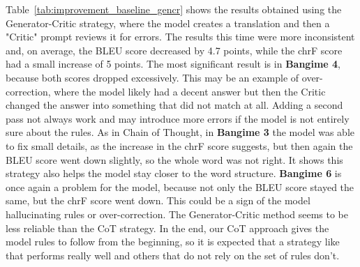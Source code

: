 \documentclass[
	a4paper, %
	10pt, %
	unnumberedsections, %
	twoside, %
]{LTJournalArticle}
\begin{document}
Table~\ref{tab:improvement_baseline_gencr} shows the results obtained using the Generator-Critic strategy, where the model creates a translation and then a "Critic" prompt reviews it for errors. The results this time were more inconsistent and, on average, the BLEU score decreased by 4.7 points, while the chrF score had a small increase of 5 points.
The most significant result is in \textbf{Bangime 4}, because both scores dropped excessively. This may be an example of over-correction, where the model likely had a decent answer but then the Critic changed the answer into something that did not match at all. Adding a second pass not always work and may introduce more errors if the model is not entirely sure about the rules. As in Chain of Thought, in \textbf{Bangime 3} the model was able to fix small details, as the increase in the chrF score suggests, but then again the BLEU score went down slightly, so the whole word was not right. It shows this strategy also helps the model stay closer to the word structure. \textbf{Bangime 6} is once again a problem for the model, because not only the BLEU score stayed the same, but the chrF score went down. This could be a sign of the model hallucinating rules or over-correction.
The Generator-Critic method seems to be less reliable than the CoT strategy. In the end, our CoT approach gives the model rules to follow from the beginning, so it is expected that a strategy like that performs really well and others that do not rely on the set of rules don't. 
\end{document}
